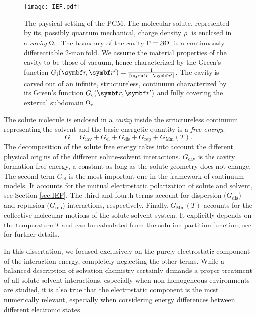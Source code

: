 \begin{figure}[!h]
  \centering
  \texttt{[image: IEF.pdf]}
  \caption[The physical setting of the polarizable continuum model.]{
  The physical setting of the \gls{PCM}. The molecular solute,
  represented by its, possibly quantum mechanical, charge density
  $\rho_\mathrm{i}$ is enclosed in a \emph{cavity} $\Omega_\mathrm{i}$.
  The boundary of the cavity $\Gamma\equiv\partial\Omega_\mathrm{i}$ is a
  continuously differentiable 2-manifold.
  We assume the material properties of the cavity to be those of vacuum,
  hence characterized by the Green's function
  $\Gi=\frac{1}{|\vect{r}-\vect{r}^\prime|}$.
  The cavity is carved out of an infinite, structureless, continuum
  characterized by its Green's function $\Ge$ and fully covering the
  external subdomain $\Omega_\mathrm{e}$.
  }
  \label{fig:IEF}
\end{figure}

The solute molecule is enclosed in a \emph{cavity} inside the
structureless continuum representing the solvent and the basic energetic
quantity is a \emph{free energy}:\autocite{Tomasi1994-gv,
Amovilli1998-pv, Tomasi2005-vm}
\begin{equation}\label{eq:free-energy}
 G = G_\mathrm{cav} + G_\mathrm{el} + G_\mathrm{dis} + G_\mathrm{rep} + G_\mathrm{Mm}(T).
\end{equation}
The decomposition of the solute free energy takes into account the
different physical origins of the different solute-solvent interactions.
$G_\mathrm{cav}$ is the cavity formation free energy, a constant as long
as the solute geometry does not change.\autocite{Tomasi1994-gv,
Floris1997-tu}
The second term $G_\mathrm{el}$ is the most important one in the
framework of continuum models. It accounts for the mutual electrostatic
polarization of solute and solvent, see Section \ref{sec:IEF}.
The third and fourth terms account for
dispersion ($G_\mathrm{dis}$) and repulsion ($G_\mathrm{rep}$) interactions,
respectively.\autocite{Amovilli1997-fo, Weijo2010-jy}
Finally, $G_\mathrm{Mm}(T)$ accounts for the collective molecular
motions of the solute-solvent system. It explicitly depends on the
temperature $T$ and can be calculated from the solution partition
function, see  for further details.

In this dissertation, we focused exclusively on the purely electrostatic
component of the interaction energy, completely neglecting the other
terms.
While a balanced description of solvation chemistry certainly demands
a proper treatment of all solute-solvent interactions, especially when
non homogeneous environments are studied,\autocite{Mozgawa2014-ad,
Mozgawa2016-wf} it is also true that the electrostatic component is the
most numerically relevant, especially when considering energy
differences between different electronic states.


